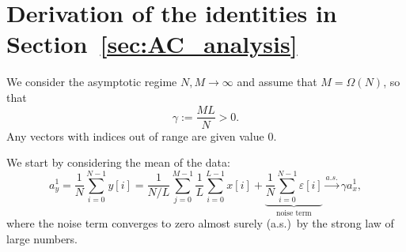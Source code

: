 \documentclass[9pt,twocolumn,twoside,lineno]{pnas-new}
\begin{document}
\section{Derivation of the identities in Section~\ref{sec:AC_analysis}} \label{sec:autocorrelation_computation}


We consider the asymptotic regime $N,M\to\infty$ and assume that $M=\Omega(N)$, so that
%
\begin{equation*}
\gamma := \frac{ML}{N}>0.
\end{equation*}
%
Any vectors with indices out of range are given value 0.

We start by considering the mean of the data:
\begin{equation*}
a_y^1 = \frac{1}{N}\sum_{i=0}^{N-1} y[i] =
\frac{1}{N/L}\sum_{j=0}^{M-1}\frac{1}{L}\sum_{i=0}^{L-1}x[i] +    
\underbrace{\frac{1}{N}\sum_{i=0}^{N-1}\varepsilon[i]}_{\text{noise term}}
\xrightarrow{a.s.}\gamma a_x^1,
\end{equation*}
%
where the noise term converges to zero almost surely (a.s.)\ by the strong law of large numbers.
\end{document}
